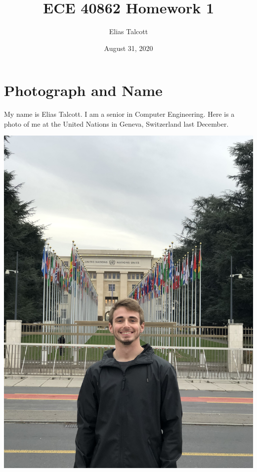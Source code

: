 \documentclass[11pt]{article}
\def \myTitle {ECE 40862 Homework 1}
\def \myName {Elias Talcott}
\def \myDate {August 31, 2020}
\begin{document}
\begin{titlepage}
\title{\myTitle}
\author{\myName}
\date{\myDate}
\maketitle
\vspace{1in}
\tableofcontents
\thispagestyle{empty}
\end{titlepage}


\section{Photograph and Name}
My name is Elias Talcott. I am a senior in Computer Engineering. Here is a photo of me at the United Nations in Geneva, Switzerland last December.

\begin{center}
\includegraphics[width=\linewidth, angle=0]{Portrait.jpg}
\end{center}
\end{document}
